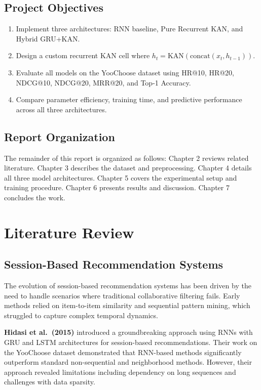 \documentclass[12pt,a4paper]{report}
\begin{document}
\section{Project Objectives}

\begin{enumerate}
    \item Implement three architectures: RNN baseline, Pure Recurrent KAN, and
          Hybrid GRU+KAN.
    \item Design a custom recurrent KAN cell where
          $h_t = \text{KAN}(\text{concat}(x_t, h_{t-1}))$.
    \item Evaluate all models on the YooChoose dataset using HR@10, HR@20,
          NDCG@10, NDCG@20, MRR@20, and Top-1 Accuracy.
    \item Compare parameter efficiency, training time, and predictive performance
          across all three architectures.
\end{enumerate}

\section{Report Organization}

The remainder of this report is organized as follows: Chapter 2 reviews related
literature. Chapter 3 describes the dataset and preprocessing. Chapter 4 details
all three model architectures. Chapter 5 covers the experimental setup and
training procedure. Chapter 6 presents results and discussion. Chapter 7 concludes
the work.

\chapter{Literature Review}

\section{Session-Based Recommendation Systems}

The evolution of session-based recommendation systems has been driven by the need
to handle scenarios where traditional collaborative filtering fails. Early methods
relied on item-to-item similarity and sequential pattern mining, which struggled
to capture complex temporal dynamics.

\textbf{Hidasi et al.\ (2015)} \cite{hidasi2015} introduced a groundbreaking
approach using RNNs with GRU and LSTM architectures for session-based
recommendations. Their work on the YooChoose dataset demonstrated that RNN-based
methods significantly outperform standard non-sequential and neighborhood methods.
However, their approach revealed limitations including dependency on long sequences
and challenges with data sparsity.
\end{document}
